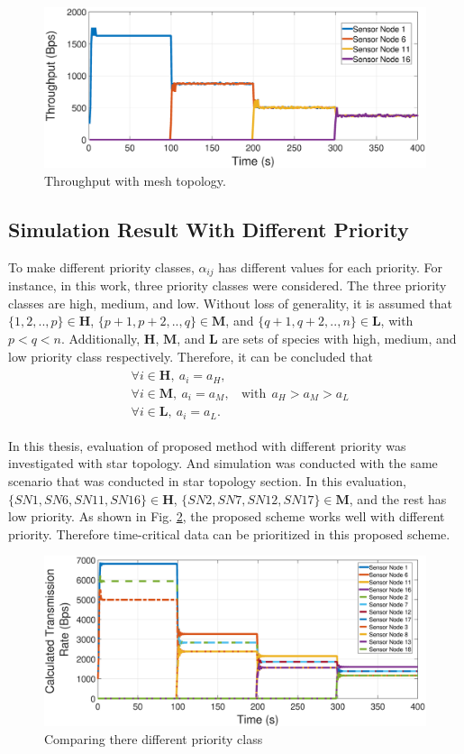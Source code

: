 \begin{figure}
	\centering
	\includegraphics[width=1\linewidth]{pics/mesh}
	\caption{Throughput with mesh topology.}
	\label{fig:mesh}
\end{figure}

\subsection{Simulation Result With Different Priority}

To make different priority classes, $\alpha_{ij}$ has different values for each priority. For instance, in this work, three priority classes were considered. The three priority classes are high, medium, and low.  Without loss of generality, it is assumed that $\{1,2,..,p\} \in \mathbf{H}$, $\{p+1,p+2,..,q\} \in \mathbf{M}$, and $\{q+1,q+2,..,n\} \in \mathbf{L}$, with $p<q<n$. Additionally, $\mathbf{H}$, $\mathbf{M}$, and $\mathbf{L}$ are sets of species with high, medium, and low priority class respectively. Therefore, it can be concluded that
\begin{align}
	\begin{split}
		&\forall i \in \mathbf{H},~a_{i}=a_H, \\
		&\forall i \in \mathbf{M},~a_{i}=a_M,~~~~\text{with}~~a_H>a_M>a_L\\
		&\forall i \in \mathbf{L},~a_{i}=a_L. 
	\end{split}
\end{align}

In this thesis, evaluation of proposed method with different priority was investigated with star topology. And simulation was conducted with the same scenario that was conducted in star topology section. In this evaluation, $\{SN1, SN6, SN11, SN16\} \in \textbf{H}$, $\{SN2, SN7, SN12, SN17\} \in \textbf{M}$, and the rest has low priority. As shown in Fig. \ref{fig:comp2}, the proposed scheme works well with different priority. Therefore time-critical data can be prioritized in this proposed scheme.

\begin{figure}
	\centering
	\includegraphics[width=1\linewidth]{pics/comp2}
	\caption{Comparing there different priority class}
	\label{fig:comp2}
\end{figure}